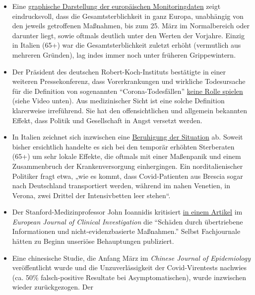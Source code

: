 \begin{itemize}
\tightlist
\item
  Eine
  \href{https://off-guardian.org/2020/03/30/covid19-yet-to-impact-europes-overall-mortality/}{graphische
  Darstellung der europäischen Monitoringdaten} zeigt eindrucksvoll,
  dass die Gesamtsterblichkeit in ganz Europa, unabhängig von den
  jeweils getroffenen Maßnahmen, bis zum 25. März im Normalbereich oder
  darunter liegt, sowie oftmals deutlich unter den Werten der Vorjahre.
  Einzig in Italien (65+) war die Gesamtsterblichkeit zuletzt erhöht
  (vermutlich aus mehreren Gründen), lag indes immer noch unter früheren
  Grippewintern.
\item
  Der Präsident des deutschen Robert-Koch-Instituts bestätigte in einer
  weiteren Presse­konferenz, dass Vorerkrankungen und wirkliche
  Todesursache für die Definition von sogenannten ``Corona-Todesfällen''
  \href{https://swprs.org/rki-relativiert-corona-todesfaelle/}{keine
  Rolle spielen} (siehe Video unten). Aus medizinischer Sicht ist eine
  solche Definition klarerweise irreführend. Sie hat den
  offensichtlichen und allgemein bekannten Effekt, dass Politik und
  Gesellschaft in Angst versetzt werden.
\item
  In Italien zeichnet sich inzwischen eine
  \href{https://www.tagesspiegel.de/politik/die-verlangsamung-ist-da-in-italien-zeichnet-sich-die-wende-in-der-coronakrise-ab/25698124.html}{Beruhigung
  der Situation} ab. Soweit bisher ersichtlich handelte es sich bei den
  temporär erhöhten Sterberaten (65+) um sehr lokale Effekte, die
  oftmals mit einer Maßenpanik und einem Zusammenbruch der
  Kranken­versorgung einhergingen. Ein norditalienischer Politiker fragt
  etwa, „wie es kommt, dass Covid-Patienten aus Brescia sogar nach
  Deutschland transportiert werden, während im nahen Venetien, in
  Verona, zwei Drittel der Intensivbetten leer stehen``.
\item
  Der Stanford-Medizinprofessor John Ioannidis kritisiert
  \href{https://onlinelibrary.wiley.com/doi/abs/10.1111/eci.13222}{in
  einem Artikel} im \emph{European Journal of Clinical Investigation}
  die ``Schäden durch übertriebene Informationen und
  nicht-evidenzbasierte Maßnahmen.'' Selbst Fachjournale hätten zu
  Beginn unseriöse Behauptungen publiziert.
\item
  Eine chinesische Studie, die Anfang März im \emph{Chinese Journal of
  Epidemiology} veröffentlicht wurde und die Unzuverlässigkeit der
  Covid-Virentests nachwies (ca. 50\% falsch-positive Resultate bei
  Asymptomatischen), wurde inzwischen wieder zurückgezogen. Der

\end{itemize}
